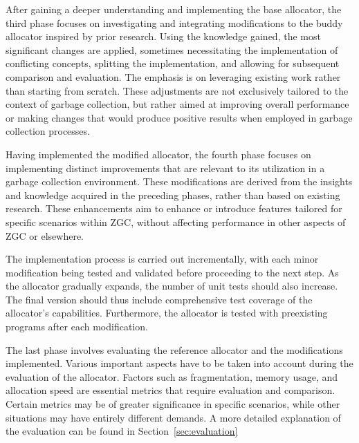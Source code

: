 After gaining a deeper understanding and implementing the base allocator, the third phase focuses on investigating and integrating modifications to the buddy allocator inspired by prior research. Using the knowledge gained, the most significant changes are applied, sometimes necessitating the implementation of conflicting concepts, splitting the implementation, and allowing for subsequent comparison and evaluation. The emphasis is on leveraging existing work rather than starting from scratch. These adjustments are not exclusively tailored to the context of garbage collection, but rather aimed at improving overall performance or making changes that would produce positive results when employed in garbage collection processes.

Having implemented the modified allocator, the fourth phase focuses on implementing distinct improvements that are relevant to its utilization in a garbage collection environment. These modifications are derived from the insights and knowledge acquired in the preceding phases, rather than based on existing research. These enhancements aim to enhance or introduce features tailored for specific scenarios within ZGC, without affecting performance in other aspects of ZGC or elsewhere.

The implementation process is carried out incrementally, with each minor modification being tested and validated before proceeding to the next step. As the allocator gradually expands, the number of unit tests should also increase. The final version should thus include comprehensive test coverage of the allocator's capabilities. Furthermore, the allocator is tested with preexisting programs after each modification.

The last phase involves evaluating the reference allocator and the modifications implemented. Various important aspects have to be taken into account during the evaluation of the allocator. Factors such as fragmentation, memory usage, and allocation speed are essential metrics that require evaluation and comparison. Certain metrics may be of greater significance in specific scenarios, while other situations may have entirely different demands. A more detailed explanation of the evaluation can be found in Section~\ref{sec:evaluation}


